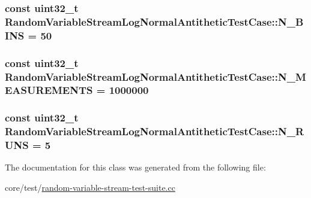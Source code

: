 \subsubsection[{\texorpdfstring{N\+\_\+\+B\+I\+NS}{N_BINS}}]{\setlength{\rightskip}{0pt plus 5cm}const uint32\+\_\+t Random\+Variable\+Stream\+Log\+Normal\+Antithetic\+Test\+Case\+::\+N\+\_\+\+B\+I\+NS = 50\hspace{0.3cm}{\ttfamily [static]}}\hypertarget{classRandomVariableStreamLogNormalAntitheticTestCase_ae77d74151c86fca9b393757cf5c222f9}{}\label{classRandomVariableStreamLogNormalAntitheticTestCase_ae77d74151c86fca9b393757cf5c222f9}
\subsubsection[{\texorpdfstring{N\+\_\+\+M\+E\+A\+S\+U\+R\+E\+M\+E\+N\+TS}{N_MEASUREMENTS}}]{\setlength{\rightskip}{0pt plus 5cm}const uint32\+\_\+t Random\+Variable\+Stream\+Log\+Normal\+Antithetic\+Test\+Case\+::\+N\+\_\+\+M\+E\+A\+S\+U\+R\+E\+M\+E\+N\+TS = 1000000\hspace{0.3cm}{\ttfamily [static]}}\hypertarget{classRandomVariableStreamLogNormalAntitheticTestCase_aecdc00cd056a3e0ebea556d2209df9e2}{}\label{classRandomVariableStreamLogNormalAntitheticTestCase_aecdc00cd056a3e0ebea556d2209df9e2}
\subsubsection[{\texorpdfstring{N\+\_\+\+R\+U\+NS}{N_RUNS}}]{\setlength{\rightskip}{0pt plus 5cm}const uint32\+\_\+t Random\+Variable\+Stream\+Log\+Normal\+Antithetic\+Test\+Case\+::\+N\+\_\+\+R\+U\+NS = 5\hspace{0.3cm}{\ttfamily [static]}}\hypertarget{classRandomVariableStreamLogNormalAntitheticTestCase_aab97d250723c997e23fb335f8791b6c9}{}\label{classRandomVariableStreamLogNormalAntitheticTestCase_aab97d250723c997e23fb335f8791b6c9}


The documentation for this class was generated from the following file\+:\begin{DoxyCompactItemize}
\item 
core/test/\hyperlink{random-variable-stream-test-suite_8cc}{random-\/variable-\/stream-\/test-\/suite.\+cc}\end{DoxyCompactItemize}
